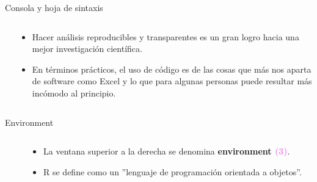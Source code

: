\documentclass[
  13pt,
  ignorenonframetext,
]{beamer}
\begin{document}
\begin{frame}{Consola y hoja de sintaxis}
\label{consola-y-hoja-de-sintaxis-2}
\begin{columns}[t]
    \begin{column}{.65\textwidth}
    \end{column}
    \begin{column}{.5\textwidth}
      \begin{itemize}
        \item Hacer análisis reproducibles y transparentes es un gran logro hacia una mejor investigación científica.
        \item En términos prácticos, el uso de código es de las cosas que más nos aparta de software como Excel y lo que para algunas personas puede resultar más incómodo al principio.
      \end{itemize}
    \end{column}
  \end{columns}
\end{frame}

\begin{frame}{Environment}
\label{environment}
\begin{columns}[t]
    \begin{column}{.65\textwidth}
    \end{column}
    \begin{column}{.5\textwidth}
      \begin{itemize}
        \item La ventana superior a la derecha se denomina \textbf{environment \textcolor{violet}{(3)}}.
        \item R se define como un ''lenguaje de programación orientada a objetos''.
      \end{itemize}
    \end{column}
  \end{columns}
\end{frame}
\end{document}
